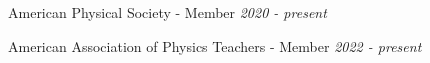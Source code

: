 American Physical Society - Member \hfill \textit{2020 - present}

\vspace{\y}
American Association of Physics Teachers - Member \hfill \textit{2022 - present}

\vspace{\y}